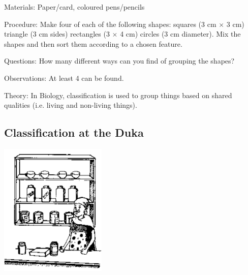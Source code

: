 \begin{multicols}{2}
\begin{description*}
\item[Materials:]{Paper/card, coloured pens/pencils}
\item[Procedure:]{Make four of each of the following shapes: squares (3 cm $\times$ 3 cm) triangle (3 cm sides)
rectangles (3 $\times$ 4 cm) circles (3 cm diameter). Mix the shapes and then sort them according to
a chosen feature.}
\item[Questions:]{How many different ways can you find of grouping the shapes?}
\item[Observations:]{At least 4 can be found.}
\item[Theory:]{In Biology, classification is used to group things based on shared qualities (i.e. living and non-living things).}
\end{description*}

\vfill
\columnbreak

\subsection{Classification at the Duka} %

\begin{center}
\includegraphics[width=0.38\textwidth]{./img/source/classification-duka.png}
\end{center}


\end{multicols}
